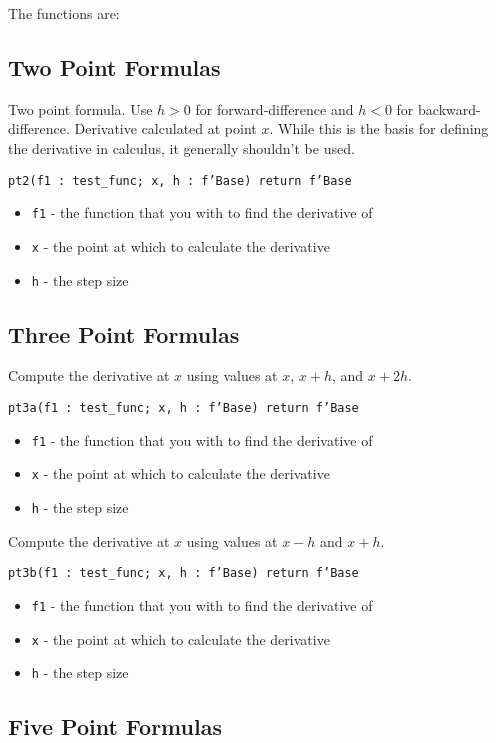 \documentclass[10pt, openany]{book}
\newcommand{\function}[1]{\texttt{#1}}
\begin{document}
The functions are:
\subsection{Two Point Formulas}
Two point formula.  Use $h>0$ for forward-difference and $h<0$ for backward-difference.  Derivative calculated at point $x$.  While this is the basis for defining the derivative in calculus, it generally shouldn't be used.

\function{pt2(f1 : test\_func; x, h : f'Base) return f'Base}
\begin{itemize}
  \item \function{f1} - the function that you with to find the derivative of
  \item \function{x} - the point at which to calculate the derivative
  \item \function{h} - the step size
\end{itemize}

\subsection{Three Point Formulas}
Compute the derivative at $x$ using values at $x$, $x+h$, and $x+2h$.

\function{pt3a(f1 : test\_func; x, h : f'Base) return f'Base}
\begin{itemize}
  \item \function{f1} - the function that you with to find the derivative of
  \item \function{x} - the point at which to calculate the derivative
  \item \function{h} - the step size
\end{itemize}

Compute the derivative at $x$ using values at $x-h$ and $x+h$.

\function{pt3b(f1 : test\_func; x, h : f'Base) return f'Base}
\begin{itemize}
  \item \function{f1} - the function that you with to find the derivative of
  \item \function{x} - the point at which to calculate the derivative
  \item \function{h} - the step size
\end{itemize}

\subsection{Five Point Formulas}
\end{document}
